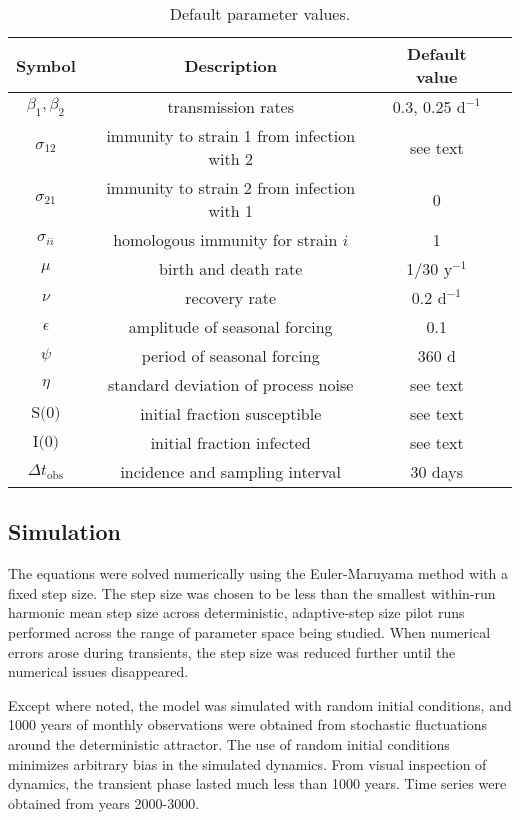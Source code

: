 \documentclass[10pt,letterpaper]{article}
\begin{document}
\begin{table}
\caption{Default parameter values.}
\begin{center}
\begin{tabular}{cccc}
{\bf Symbol} &{\bf Description} & {\bf Default value} \\ 
\hline
$\beta_1, \beta_2$ & transmission rates & 0.3, 0.25 $\text{d}^{-1}$ \\
$\sigma_{12}$ & immunity to strain 1 from infection with 2 & see text\\
$\sigma_{21}$ & immunity to strain 2 from infection with 1 & 0\\
$\sigma_{ii}$ & homologous immunity for strain $i$ & 1\\
$\mu$ & birth and death rate & 1/30 $\text{y}^{-1}$ \\
$\nu$ & recovery rate & 0.2 $\text{d}^{-1}$ \\
$\epsilon$ & amplitude of seasonal forcing & 0.1 \\
$\psi$ & period of seasonal forcing & 360 d\\
$\eta$ & standard deviation of process noise & see text \\
$\text{S(0)}$ & initial fraction susceptible & see text \\
$\text{I(0)}$ & initial fraction infected & see text\\
$\Delta t_\text{obs}$ & incidence and sampling interval & 30 days\\
\end {tabular}
\end{center}

\label{table:defaultParameters}
\end{table}

\subsection*{Simulation}

The equations were solved numerically using the Euler-Maruyama method with a fixed step size. 
The step size was chosen to be less than the smallest within-run harmonic mean step size across deterministic, adaptive-step size pilot runs performed across the range of parameter space being studied. 
When numerical errors arose during transients, the step size was reduced further until the numerical issues disappeared.

Except where noted, the model was simulated with random initial conditions, and 1000 years of monthly observations were obtained from stochastic fluctuations around the deterministic attractor.
The use of random initial conditions minimizes arbitrary bias in the simulated dynamics.
From visual inspection of dynamics, the transient phase lasted much less than 1000 years. Time series were obtained from years 2000-3000.
\end{document}

